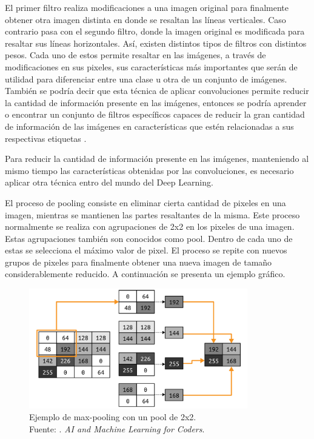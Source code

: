 El primer filtro realiza modificaciones a una imagen original para finalmente obtener otra imagen distinta en donde se resaltan las líneas verticales. Caso contrario pasa con el segundo filtro, donde la imagen original es modificada para resaltar sus líneas horizontales. Así, existen distintos tipos de filtros con distintos pesos. Cada uno de estos permite resaltar en las imágenes, a través de modificaciones en sus pixeles, sus características más importantes que serán de utilidad para diferenciar entre una clase u otra de un conjunto de imágenes. También se podría decir que esta técnica de aplicar convoluciones permite reducir la cantidad de información presente en las imágenes, entonces se podría aprender o encontrar un conjunto de filtros específicos capaces de reducir la gran cantidad de información de las imágenes en características que estén relacionadas a sus respectivas etiquetas \parencite{bk_moroney2020aiandml}.

Para reducir la cantidad de información presente en las imágenes, manteniendo al mismo tiempo las características obtenidas por las convoluciones, es necesario aplicar otra técnica entro del mundo del Deep Learning.

El proceso de pooling consiste en eliminar cierta cantidad de pixeles en una imagen, mientras se mantienen las partes resaltantes de la misma. Este proceso normalmente se realiza con agrupaciones de 2x2 en los pixeles de una imagen. Estas agrupaciones también son conocidos como pool. Dentro de cada uno de estas se selecciona el máximo valor de pixel. El proceso se repite con nuevos grupos de pixeles para finalmente obtener una nueva imagen de tamaño considerablemente reducido. \parencite{bk_moroney2020aiandml} A continuación se presenta un ejemplo gráfico.

\begin{figure}[H]
	\begin{center}
		\includegraphics[width=0.85\textwidth]{2/figures/cnn_pool_examp.png}
		\caption[Ejemplo de max-pooling con un pool de 2x2]{Ejemplo de max-pooling con un pool de 2x2. \\
		Fuente: \cite{bk_moroney2020aiandml}. \textit{AI and Machine Learning for Coders}.}
		\label{2:fig204}
	\end{center}
\end{figure}

